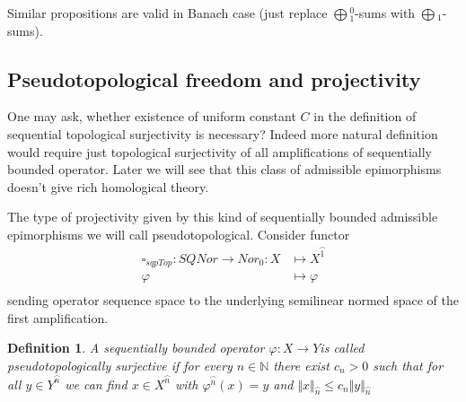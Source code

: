 \documentclass[12pt]{article}
\newtheorem{definition}[theorem]{Definition}
\begin{document}
Similar propositions are valid in Banach case (just replace $\bigoplus{}_1^0$-sums with $\bigoplus{}_1$-sums).







































\subsection{Pseudotopological freedom and projectivity}

One may ask, whether existence of uniform constant $C$ in the definition of sequential topological surjectivity is necessary? Indeed more natural definition would require just topological surjectivity of all amplifications of sequentially bounded operator. Later we will see that this class of admissible epimorphisms doesn't give rich homological theory. 

The type of projectivity given by this kind of sequentially bounded admissible epimorphisms we will call pseudotopological. Consider functor
$$
\begin{aligned}
\square_{sqpTop} : SQNor \to Nor_0: X &\mapsto X^{\wideparen{1}}\\
\varphi&\mapsto\varphi\\
\end{aligned}
$$
sending operator sequence space to the underlying semilinear normed space of the first amplification.

\begin{definition}\label{DefPsSQTopSurjOp} A sequentially bounded operator $\varphi:X\to Y$is called pseudotopologically surjective if for every $n\in\mathbb{N}$ there exist $c_n>0$ such that for all $y\in Y^{\wideparen{n}}$ we can find $x\in X^{\wideparen{n}}$ with $\varphi^{\wideparen{n}}(x)=y$ and $\Vert x\Vert_{\wideparen{n}}\leq c_n\Vert y\Vert_{\wideparen{n}}$ 
\end{definition}
\end{document}

